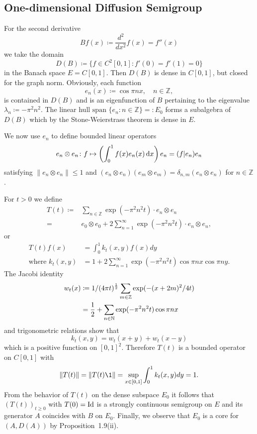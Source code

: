 \subsection{One-dimensional Diffusion Semigroup}\label{subsec:a1-2.7}
For the second derivative 
\[
    Bf(x) \coloneqq \frac{d^{2}}{dx^{2}}f(x) = f''(x)
\]
we take the domain
\[
    D(B) \coloneqq \{f \in C^{2}\left[ 0,1 \right] \colon f'(0) = f'(1) = 0\}
\]
in the Banach space $E = C\left[ 0,1 \right]$.
Then $D(B)$ is dense in $C\left[ 0,1 \right]$, but closed for the graph norm.
Obviously, each function
\[
    e_{n}(x) \coloneqq \cos \pi nx, \quad n \in \mathbb{Z},
\]
is contained in $D(B)$ and is an eigenfunction of $B$ pertaining to the eigenvalue $\lambda_{n} \coloneqq -\pi^{2}n^{2}$.
The linear hull $\text{span }\{e_{n} \colon n \in \mathbb{Z}\} = \colon E_{0}$ forms a subalgebra of $D(B)$ which by the Stone-Weierstrass theorem is dense in $E$.

We now use $e_{n}$ to define bounded linear operators 
\[
	e_{n} \otimes e_{n} \colon f \mapsto \left(\int_{0}^{1} f(x)e_{n}(x) \dx \right)e_{n} 
		= ( f | e_{n} ) e_{n} %
\]
satisfying $\|e_{n} \otimes e_{n}\| \leq 1$ and
$(e_{n} \otimes e_{n})(e_{m} \otimes e_{m}) = \delta_{n,m}(e_{n} \otimes e_{n})$ for $n \in \mathbb{Z}$.

For $t > 0$ we define
\begin{align*}
T(t) \coloneqq{}& \sum_{n \in \mathbb{Z}} \exp(-\pi^{2}n^{2}t) \cdot e_{n} \otimes e_{n} \\
		={}& e_{0} \otimes e_{0} + 2\sum_{n=1}^{\infty} \exp(-\pi^{2}n^{2}t) \cdot e_{n} \otimes e_{n},
\end{align*}
or
\begin{align*}
    T(t)f(x) &= \int_{0}^{1} k_{t}(x,y)f(x)dy \\
    \text{where } k_{t}(x,y) &= 1 + 2\sum_{n=1}^{\infty} \exp(-\pi^{2}n^{2}t) \cos\pi nx \cos\pi ny .
\end{align*}
The Jacobi identity
\begin{align*}
    w_{t}(x) &\coloneqq 1/(4\pi t)^{\frac{1}{2}} \sum_{m \in \mathbb{Z}} \exp(-(x+2m)^{2}/4t) \\
    &= \frac{1}{2} + \sum_{n \in \mathbb{N}} \exp(-\pi^{2}n^{2}t) \cos\pi nx
\end{align*}
and trigonometric relations show that
\[
    k_{t}(x,y) = w_{t}(x+y) + w_{t}(x-y)
\]
which is a positive function on $\left[ 0,1 \right]^{2}$.
Therefore $T(t)$ is a bounded operator on $C\left[ 0,1 \right]$ with
\[
    \|T(t)\| = \|T(t)\1\| = \sup_{x \in \left[ 0,1 \right]} \int_{0}^{1} k_{t}(x,y)dy = 1 .
\]
From the behavior of $T(t)$ on the dense subspace $E_{0}$ it follows that $(T(t))_{t \geq 0}$ with $T(0) = \operatorname{Id}$ is a strongly continuous semigroup on $E$ and its generator $A$ coincides with $B$ on $E_{0}$.
Finally, we observe that $E_{0}$ is a core for $(A,D(A))$ by Proposition~1.9(ii).

